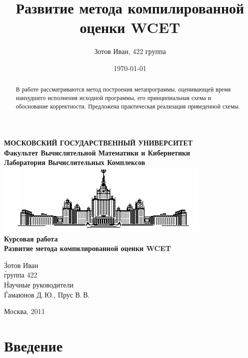\documentclass[12pt,a4paper]{article}
\title{Развитие метода компилированной оценки WCET}
\author{Зотов Иван, 422 группа}
\date{\today}
\begin{document}
\pagestyle{plain}


\begin{titlepage}
\begin{center}

{\bf МОСКОВСКИЙ ГОСУДАРСТВЕННЫЙ УНИВЕРСИТЕТ\\
  Факультет Вычислительной Математики и Кибернетики\\
  Лаборатория Вычислительных Комплексов\\[8mm]
 \includegraphics{resource/gzlogo.png}\\[8mm]
  Курсовая работа\\[24mm]
  Развитие метода компилированной оценки WCET \\
}
\vspace{10mm}
\begin{singlespace}
\begin{tabbing}
	\` Зотов Иван\\
	\` группа 422\\
	\` Научные руководители\\
	\` Гамаюнов Д.\,Ю., Прус В.\,В.
\end{tabbing}
\end{singlespace}
\vspace{5cm}
Москва, 2011
\end{center}
\end{titlepage}

\newpage
\begin{abstract}

В работе рассматриваются метод построения метапрограммы, оценивающей время наихудшего исполнения исходной программы, его принципиальная схема и обоснование корректности. Предложена практическая реализация приведенной схемы.

\end{abstract}
 
\newpage
\tableofcontents

\newpage

\section{Введение}
\end{document}

